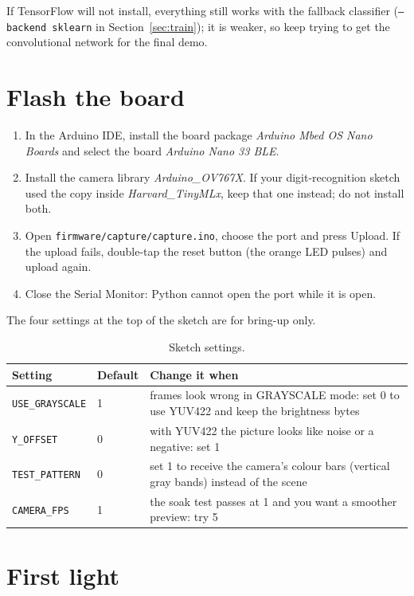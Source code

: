 \documentclass[11pt]{article}
\newcommand{\cmd}[1]{\texttt{#1}}
\begin{document}
If TensorFlow will not install, everything still works with the fallback classifier
(\cmd{--backend sklearn} in Section~\ref{sec:train}); it is weaker, so keep trying to get the
convolutional network for the final demo.

\section{Flash the board}

\begin{enumerate}
\item In the Arduino IDE, install the board package \emph{Arduino Mbed OS Nano Boards} and select
  the board \emph{Arduino Nano 33 BLE}.
\item Install the camera library \emph{Arduino\_OV767X}. If your digit-recognition sketch used the
  copy inside \emph{Harvard\_TinyMLx}, keep that one instead; do not install both.
\item Open \cmd{firmware/capture/capture.ino}, choose the port and press Upload. If the upload
  fails, double-tap the reset button (the orange LED pulses) and upload again.
\item Close the Serial Monitor: Python cannot open the port while it is open.
\end{enumerate}

The four settings at the top of the sketch are for bring-up only.

\begin{table}[H]
\centering
\begin{tabular}{C{3cm}C{1.5cm}C{6.8cm}}
\toprule
\textbf{Setting} & \textbf{Default} & \textbf{Change it when} \\
\midrule
\cmd{USE\_GRAYSCALE} & 1 & frames look wrong in GRAYSCALE mode: set 0 to use YUV422 and keep the brightness bytes \\
\cmd{Y\_OFFSET} & 0 & with YUV422 the picture looks like noise or a negative: set 1 \\
\cmd{TEST\_PATTERN} & 0 & set 1 to receive the camera's colour bars (vertical gray bands) instead of the scene \\
\cmd{CAMERA\_FPS} & 1 & the soak test passes at 1 and you want a smoother preview: try 5 \\
\bottomrule
\end{tabular}
\caption{Sketch settings.}
\end{table}

\section{First light}
\end{document}
